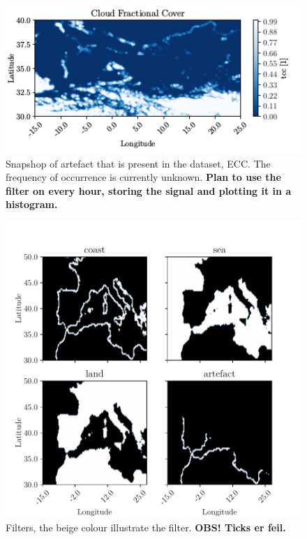 \begin{figure}
    \centering
    \includegraphics{python_figs/example_artefact.png}
    \caption[Artefact in European Cloud Cover dataset.]{Snapshop of artefact that is present in the dataset, ECC. The frequency of occurrence is currently unknown. \textbf{Plan to use the filter on every hour, storing the signal and plotting it in a histogram.}}
    \label{fig:example_artefact}
\end{figure}

\begin{figure}
    \centering
    \includegraphics{python_figs/filters.pdf}
    \caption{Filters, the beige colour illustrate the filter. \textbf{OBS! Ticks er feil.}}
    \label{fig:filters_subplot}
\end{figure}


